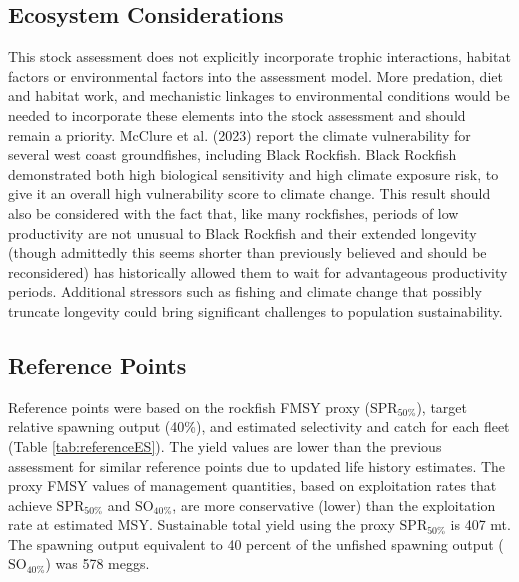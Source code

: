 \documentclass[11pt,
  english,
  letterpaper,
]{article}
\begin{document}
\hypertarget{ecosystem-considerations}{%
\subsection*{Ecosystem Considerations}\label{ecosystem-considerations}}

This stock assessment does not explicitly incorporate trophic interactions, habitat factors or environmental factors into the assessment model. More predation, diet and habitat work, and mechanistic linkages to environmental conditions would be needed to incorporate these elements into the stock assessment and should remain a priority. McClure et al. (2023) report the climate vulnerability for several west coast groundfishes, including Black Rockfish. Black Rockfish demonstrated both high biological sensitivity and high climate exposure risk, to give it an overall high vulnerability score to climate change. This result should also be considered with the fact that, like many rockfishes, periods of low productivity are not unusual to Black Rockfish and their extended longevity (though admittedly this seems shorter than previously believed and should be reconsidered) has historically allowed them to wait for advantageous productivity periods. Additional stressors such as fishing and climate change that possibly truncate longevity could bring significant challenges to population sustainability.

\hypertarget{reference-points}{%
\subsection*{Reference Points}\label{reference-points}}

Reference points were based on the rockfish FMSY proxy (\(\text{SPR}_{50\%}\)), target relative spawning output (40\%), and estimated selectivity and catch for each fleet (Table \ref{tab:referenceES}). The yield values are lower than the previous assessment for similar reference points due to updated life history estimates. The proxy FMSY values of management quantities, based on exploitation rates that achieve \(\text{SPR}_{50\%}\) and \(\text{SO}_{40\%}\), are more conservative (lower) than the exploitation rate at estimated MSY. Sustainable total yield using the proxy \(\text{SPR}_{50\%}\) is 407 mt. The spawning output equivalent to 40 percent of the unfished spawning output (\(\text{SO}_{40\%}\)) was 578 meggs.
\end{document}
